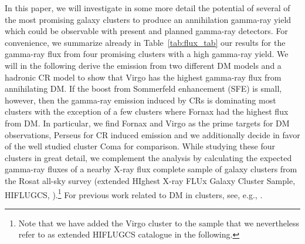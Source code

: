 \documentclass[10pt,aps,pra,reprint,amsmath,amsfonts,amssymb,showpacs,nofootinbib,floatfix]{revtex4-1}
\begin{document}
In this paper, we will investigate in some more detail the potential
of several of the most promising galaxy clusters to produce an
annihilation gamma-ray yield which could be observable with present
and planned gamma-ray detectors. For convenience, we summarize already
in Table~\ref{tab:flux_tab} our results for the gamma-ray flux from
four promising clusters with a high gamma-ray yield. We will in the
following derive the emission from two different DM models and a
hadronic CR model to show that Virgo has the highest gamma-ray flux
from annihilating DM. If the boost from Sommerfeld enhancement (SFE)
is small, however, then the gamma-ray emission induced by CRs is
dominating most clusters with the exception of a few clusters where
Fornax had the highest flux from DM. In particular, we find Fornax and
Virgo as the prime targets for DM observations, Perseus for CR induced
emission and we additionally decide in favor of the well studied
cluster Coma for comparison. While studying these four clusters in
great detail, we complement the analysis by calculating the expected
gamma-ray fluxes of a nearby X-ray flux complete sample of galaxy
clusters from the Rosat all-sky survey (extended HIghest X-ray FLUx
Galaxy Cluster Sample, HIFLUGCS,
\citealt{2002ApJ...567..716R}).\footnote{Note that we have added the
  Virgo cluster to the sample that we nevertheless refer to as
  extended HIFLUGCS catalogue in the following.}  For previous work
related to DM in clusters, see, e.g.,
\cite{2006A&A...455...21C,2009PhRvD..80b3005J}.
\end{document}
